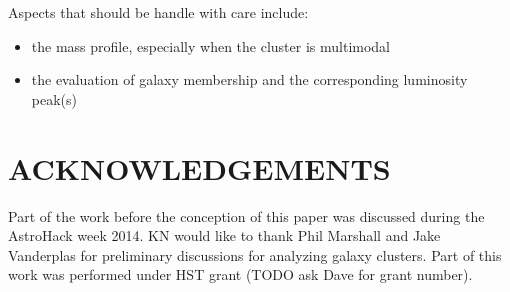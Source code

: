 Aspects that should be handle with care include:
\begin{itemize}
		\item the mass profile, especially when the cluster is multimodal 
		\item the evaluation of galaxy membership and the corresponding luminosity
			peak(s)
	\end{itemize}



\section{ACKNOWLEDGEMENTS}
Part of the work before the conception of this paper was discussed during 
the AstroHack week 2014. KN would like to thank Phil
Marshall and Jake Vanderplas for preliminary discussions for analyzing galaxy clusters. 
Part of this work was performed under HST grant (TODO ask Dave for grant
number). 








